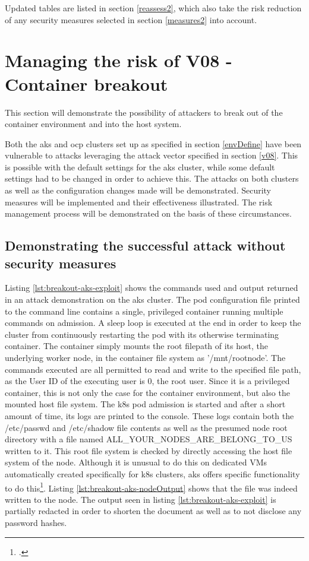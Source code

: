 Updated tables are listed in section \ref{reassess2}, which also take the risk reduction of any security measures selected in section \ref{measures2} into account.

\section{Managing the risk of V08 - Container breakout}

This section will demonstrate the possibility of attackers to break out of the container environment and into the host system.

Both the \gls{aks} and \gls{ocp} clusters set up as specified in section \ref{envDefine} have been vulnerable to attacks leveraging the attack vector specified in section \ref{v08}. This is possible with the default settings for the \gls{aks} cluster, while some default settings had to be changed in order to achieve this. The attacks on both clusters as well as the configuration changes made will be demonstrated. Security measures will be implemented and their effectiveness illustrated. The risk management process will be demonstrated on the basis of these circumstances.

\subsection{Demonstrating the successful attack without security measures}
Listing \ref{lst:breakout-aks-exploit} shows the commands used and output returned in an attack demonstration on the \gls{aks} cluster.
The pod configuration file printed to the command line contains a single, privileged container running multiple commands on admission.
A sleep loop is executed at the end in order to keep the cluster from continuously restarting the pod with its otherwise terminating container.
The container simply mounts the root filepath of its host, the underlying worker node, in the container file system as '/mnt/rootnode'. 
The commands executed are all permitted to read and write to the specified file path, as the User ID of the executing user is 0, the root user. Since it is a privileged container, this is not only the case for the container environment, but also the mounted host file system.
The \gls{k8s} pod admission is started and after a short amount of time, its logs are printed to the console. 
These logs contain both the {\slash}etc{\slash}passwd and {\slash}etc{\slash}shadow file contents as well as the presumed node root directory with a file named ALL{\_}YOUR{\_}NODES{\_}ARE{\_}BELONG{\_}TO{\_}US written to it.
This root file system is checked by directly accessing the host file system of the node. Although it is unusual to do this on dedicated VMs automatically created specifically for \gls{k8s} clusters, \gls{aks} offers specific functionality to do this\footcite{aksNodeSsh}. Listing \ref{lst:breakout-aks-nodeOutput} shows that the file was indeed written to the node.
The output seen in listing \ref{lst:breakout-aks-exploit} is partially redacted in order to shorten the document as well as to not disclose any password hashes.

